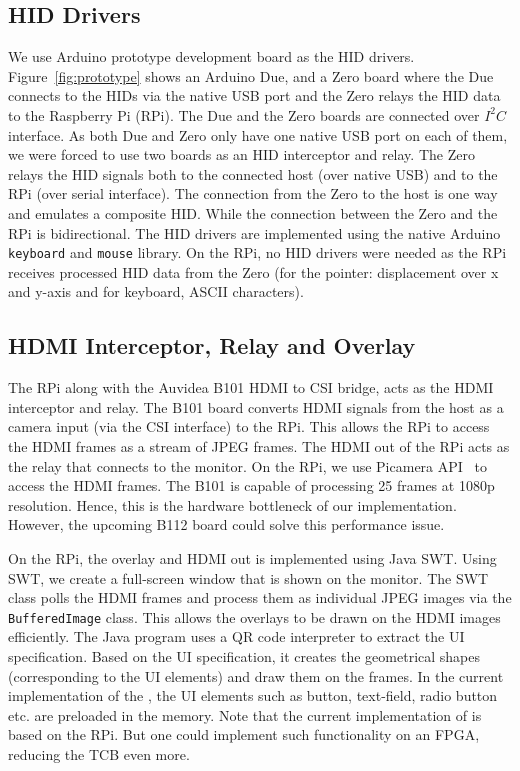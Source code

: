 \subsection{HID Drivers}
We use Arduino prototype development board as the HID drivers. Figure~\ref{fig:prototype} shows an Arduino Due, and a Zero board where the Due connects to the HIDs via the native USB port and the Zero relays the HID data to the Raspberry Pi (RPi). The Due and the Zero boards are connected over $I^2C$ interface. As both Due and Zero only have one native USB port on each of them, we were forced to use two boards as an HID interceptor and relay. The Zero relays the HID signals both to the connected host (over native USB) and to the RPi (over serial interface). The connection from the Zero to the host is one way and emulates a composite HID. While the connection between the Zero and the RPi is bidirectional. The HID drivers are implemented using the native Arduino \texttt{keyboard} and \texttt{mouse} library. On the RPi, no HID drivers were needed as the RPi receives processed HID data from the Zero (for the pointer: displacement over x and y-axis and for keyboard, ASCII characters).


\subsection{HDMI Interceptor, Relay and Overlay}
The RPi along with the Auvidea B101 HDMI to CSI bridge, acts as the HDMI interceptor and relay. The B101 board converts HDMI signals from the host as a camera input (via the CSI interface) to the RPi. This allows the RPi to access the HDMI frames as a stream of JPEG frames. The HDMI out of the RPi acts as the relay that connects to the monitor. On the RPi, we use Picamera API~\cite{picamera} to access the HDMI frames. The B101 is capable of processing 25 frames at 1080p resolution. Hence, this is the hardware bottleneck of our implementation. However, the upcoming B112 board
could solve this performance issue.

On the RPi, the overlay and HDMI out is implemented using Java SWT. Using SWT, we create a full-screen window that is shown on the monitor. The SWT class polls the HDMI frames and process them as individual JPEG images via the \texttt{BufferedImage} class. This allows the overlays to be drawn on the HDMI images efficiently. The Java program uses a QR code interpreter to extract the UI specification. Based on the UI specification, it creates the geometrical shapes (corresponding to the UI elements) and draw them on the frames. In the current implementation of the \name, the UI elements such as button, text-field, radio button etc. are preloaded in the \device memory. Note that the current implementation of \device is based on the RPi. But one could implement such functionality on an FPGA, reducing the TCB even more. 


